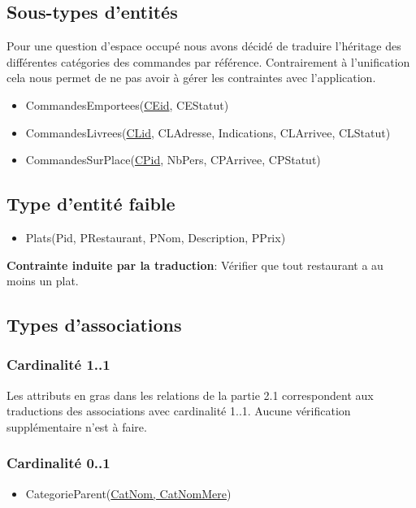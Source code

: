 \documentclass[10pt, a4paper]{article}
\begin{document}
\subsection{Sous-types d'entités}

Pour une question d'espace occupé nous avons décidé de traduire l'héritage des différentes catégories des commandes par référence.
Contrairement à l'unification cela nous permet de ne pas avoir à gérer les contraintes avec l'application.

\begin{itemize}
    \item CommandesEmportees\@(\underline{CEid}, CEStatut)
    \item CommandesLivrees\@(\underline{CLid}, CLAdresse, Indications, CLArrivee, CLStatut)
    \item CommandesSurPlace\@(\underline{CPid}, NbPers, CPArrivee, CPStatut)
\end{itemize}

\subsection{Type d'entité faible}

\begin{itemize}
    \item Plats\@(Pid, PRestaurant, PNom, Description, PPrix)
\end{itemize}

\textbf{Contrainte induite par la traduction}: Vérifier que tout restaurant a au moins un plat.

\subsection{Types d'associations}

\subsubsection{Cardinalité 1..1}

Les attributs en gras dans les relations de la partie 2.1 correspondent aux traductions des associations avec cardinalité 1..1.
Aucune vérification supplémentaire n'est à faire.
\subsubsection{Cardinalité 0..1}

\begin{itemize}
    \item CategorieParent\@(\underline{CatNom, CatNomMere})
\end{itemize}
\end{document}
